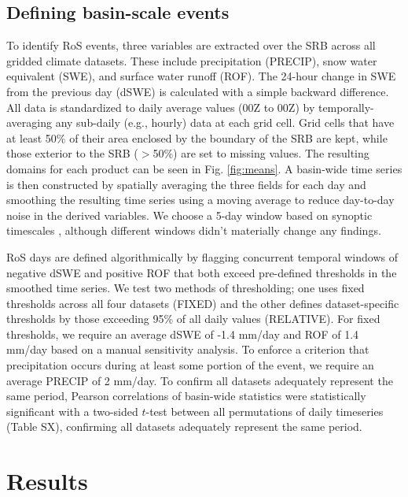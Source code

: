 \documentclass[draft]{agujournal2019}
\begin{document}
\subsection{Defining basin-scale events}

To identify RoS events, three variables are extracted over the SRB across all gridded climate datasets. 
These include precipitation (PRECIP), snow water equivalent (SWE), and surface water runoff (ROF). 
The 24-hour change in SWE from the previous day (dSWE) is calculated with a simple backward difference. 
All data is standardized to daily average values (00Z to 00Z) by temporally-averaging any sub-daily (e.g., hourly) data at each grid cell.  
Grid cells that have at least 50\% of their area enclosed by the boundary of the SRB are kept, while those exterior to the SRB ($>$50\%) are set to missing values. 
The resulting domains for each product can be seen in Fig. \ref{fig:means}. A basin-wide time series is then constructed by spatially averaging the three fields for each day and smoothing the resulting time series using a moving average to reduce day-to-day noise in the derived variables. 
We choose a 5-day window based on synoptic timescales \citep{holton2004introduction}, although different windows didn't materially change any findings.

RoS days are defined algorithmically by flagging concurrent temporal windows of negative dSWE and positive ROF that both exceed pre-defined thresholds in the smoothed time series. 
We test two methods of thresholding; one uses fixed thresholds across all four datasets (FIXED) and the other defines dataset-specific thresholds by those exceeding 95\% of all daily values (RELATIVE). 
For fixed thresholds, we require an average dSWE of -1.4 mm/day and ROF of 1.4 mm/day based on a manual sensitivity analysis. To enforce a criterion that precipitation occurs during at least some portion of the event, we require an average PRECIP of 2 mm/day. 
To confirm all datasets adequately represent the same period, Pearson correlations of basin-wide statistics were statistically significant with a two-sided $t$-test between all permutations of daily timeseries (Table SX), confirming all datasets adequately represent the same period.


\section{Results}
\end{document}
